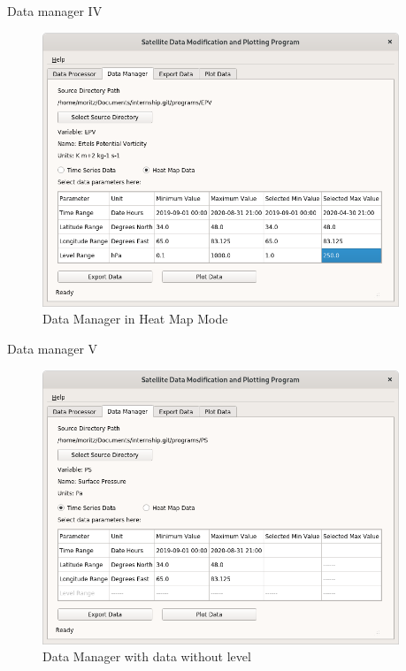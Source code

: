 \documentclass[
    hyperref={
        final,
        colorlinks=true,
        menucolor=black,
        anchorcolor=green,
        linkcolor=blue,
        citecolor=red,
        pdftitle={RS RAS Internship Presentation},
        pdfauthor={Moritz M. Konarski}
    }
]{beamer}
\begin{document}
\begin{frame}{Data manager IV}
\begin{figure}
    \includegraphics[width=0.95\textwidth]{../graphics/dm04}
    \vspace{-8pt}
    \caption{Data Manager in Heat Map Mode}
\end{figure}
\end{frame}

\begin{frame}{Data manager V}
\begin{figure}
    \includegraphics[width=0.95\textwidth]{../graphics/dm05}
    \vspace{-8pt}
    \caption{Data Manager with data without level}
\end{figure}
\end{frame}
\end{document}
